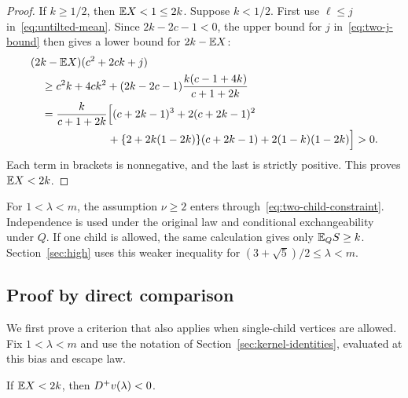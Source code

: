 \begin{proof}
If $k\ge1/2$, then $\mathbb E X<1\le2k$. Suppose $k<1/2$. First use $\ell\le j$ in~\eqref{eq:untilted-mean}. Since $2k-2c-1<0$, the upper bound for $j$ in~\eqref{eq:two-j-bound} then gives a lower bound for $2k-\mathbb E X$:
\begin{align*}
 &(2k-\mathbb E X)(c^2+2ck+j)\\
 &\quad\ge c^2k+4ck^2+(2k-2c-1)\frac{k(c-1+4k)}{c+1+2k}\\
 &\quad=\frac{k}{c+1+2k}\Bigl[
 (c+2k-1)^3+2(c+2k-1)^2\\
 &\hspace{7em}+\{2+2k(1-2k)\}(c+2k-1)
 +2(1-k)(1-2k)\Bigr]>0.
\end{align*}
Each term in brackets is nonnegative, and the last is strictly positive. This proves $\mathbb E X<2k$.
\end{proof}

For $1<\lambda<m$, the assumption $\nu\ge2$ enters through~\eqref{eq:two-child-constraint}. Independence is used under the original law and conditional exchangeability under $Q$. If one child is allowed, the same calculation gives only $\mathbb E_QS\ge k$. Section~\ref{sec:high} uses this weaker inequality for $(3+\sqrt5)/2\le\lambda<m$.

\subsection{Proof by direct comparison}\label{sec:direct-comparison}
We first prove a criterion that also applies when single-child vertices are allowed. Fix $1<\lambda<m$ and use the notation of Section~\ref{sec:kernel-identities}, evaluated at this bias and escape law.

\begin{proposition}\label{prop:criterion}
If $\mathbb E X<2k$, then $D^{+} v(\lambda)<0$.
\end{proposition}

